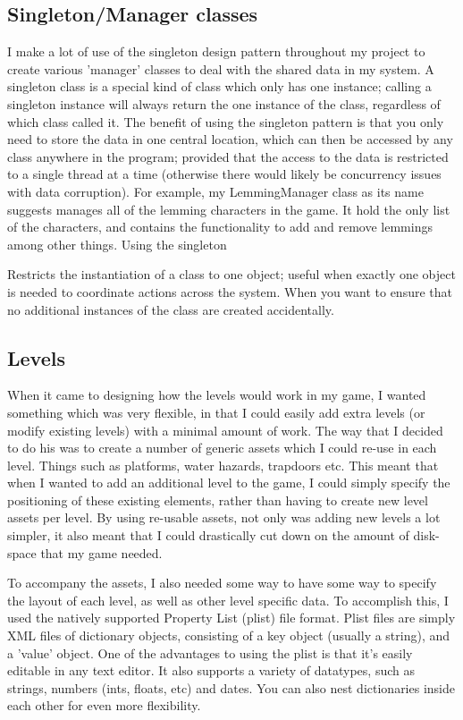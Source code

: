 \documentclass[a4paper,oneside]{report}
\begin{document}
\subsection{Singleton/Manager classes} I make a lot of use of the singleton design pattern throughout my project to create various 'manager' classes to deal with the shared data in my system. A singleton class is a special kind of class which only has one instance; calling a singleton instance will always return the one instance of the class, regardless of which class called it. The benefit of using the singleton pattern is that you only need to store the data in one central location, which can then be accessed by any class anywhere in the program; provided that the access to the data is restricted to a single thread at a time (otherwise there would likely be concurrency issues with data corruption). For example, my LemmingManager class as its name suggests manages all of the lemming characters in the game. It hold the only list of the characters, and contains the functionality to add and remove lemmings among other things. Using the singleton 

Restricts the instantiation of a class to one object; useful when exactly one object is needed to coordinate actions across the system. When you want to ensure that no additional instances of the class are created accidentally.

\subsection{Levels} When it came to designing how the levels would work in my game, I wanted something which was very flexible, in that I could easily add extra levels (or modify existing levels) with a minimal amount of work. The way that I decided to do his was to create a number of generic assets which I could re-use in each level. Things such as platforms, water hazards, trapdoors etc. This meant that when I wanted to add an additional level to the game, I could simply specify the positioning of these existing elements, rather than having to create new level assets per level. By using re-usable assets, not only was adding new levels a lot simpler, it also meant that I could drastically cut down on the amount of disk-space that my game needed.

To accompany the assets, I also needed some way to have some way to specify the layout of each level, as well as other level specific data. To accomplish this, I used the natively supported Property List (plist) file format. Plist files are simply XML files of dictionary objects, consisting of a key object (usually a string), and a 'value' object. One of the advantages to using the plist is that it's easily editable in any text editor. It also supports a variety of datatypes, such as strings, numbers (ints, floats, etc) and dates. You can also nest dictionaries inside each other for even more flexibility. 
\end{document}
